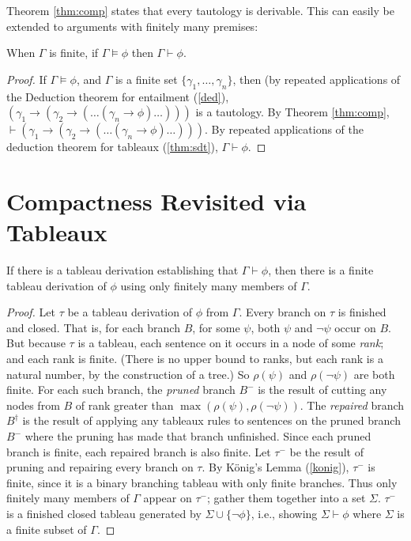 Theorem \ref{thm:comp} states that every tautology is derivable. This can easily be extended to arguments with finitely many premises: \begin{theorem}\label{thm:fargc} When $\Gamma$ is finite, if\/ $\Gamma \vDash \phi$ then $\Gamma \vdash \phi$.	
\end{theorem}
\begin{proof}
	If $\Gamma \vDash \phi$, and $\Gamma$ is a finite set $\{\gamma_{1},\ldots,\gamma_{n}\}$, then (by repeated applications of the Deduction theorem for entailment (\autoref{ded}), $(\gamma_{1} \to (\gamma_{2} \to (\ldots(\gamma_{n} \to \phi)\ldots)))$ is a tautology. By Theorem \ref{thm:comp}, $\vdash (\gamma_{1} \to (\gamma_{2} \to (\ldots(\gamma_{n} \to \phi)\ldots)))$. By repeated applications of the deduction theorem for tableaux (\autoref{thm:sdt}), $\Gamma \vdash \phi$.
\end{proof}





\section{Compactness Revisited via Tableaux}

\begin{theorem}\label{ftd}
	If there is a tableau derivation establishing that $Γ ⊢ \phi$, then there is a finite tableau derivation of $\phi$ using only finitely many members of $\Gamma$.
\end{theorem} \begin{proof}
	Let $τ$ be a tableau derivation of $\phi$ from $Γ$. Every branch on $τ$ is finished and closed. That is, for each branch $B$, for some $\psi$, both $\psi$ and $\neg\psi$ occur on $B$. But because $\tau$ is a tableau, each sentence on it occurs in a node of some \emph{rank}; and each rank is finite. (There is no upper bound to ranks, but each rank is a natural number, by the construction of a tree.) So $\rho(\psi)$ and $\rho(\neg\psi)$ are both finite. For each such branch, the \emph{pruned} branch $B^{-}$ is the result of cutting any nodes from $B$ of rank greater than $\max(\rho(\psi),\rho(\neg\psi))$. The \emph{repaired} branch $B^{\dag}$ is the result of applying any tableaux rules to sentences on the pruned branch $B^{-}$ where the pruning has made that branch unfinished. Since each pruned branch is finite, each repaired branch is also finite. Let $\tau^{-}$ be the result of pruning and repairing every branch on $\tau$. By König's Lemma (\ref{konig}), $\tau^{-}$ is finite, since it is a binary branching tableau with only finite branches. Thus only finitely many members of $\Gamma$ appear on $\tau^{-}$; gather them together into a set  $\Sigma$. $\tau^{-}$ is a finished closed tableau generated by $\Sigma\cup\{\neg\phi\}$, i.e., showing $\Sigma\vdash\phi$ where $\Sigma$ is a finite subset of $\Gamma$.	
\end{proof}


